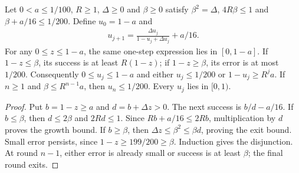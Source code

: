 \begin{lemma}
    \label{lem:interleaved_trim_stopping_envelope}
    \leanok
    Let $0<a\le1/100$, $R\ge1$, $\Delta\ge0$ and $\beta\ge0$ satisfy
    $\beta^2=\Delta$, $4R\beta\le1$ and $\beta+a/16\le1/200$.
    Define $u_0=1-a$ and
    \begin{align}
        u_{j+1}=\frac{\Delta u_j}{1-u_j+\Delta u_j}+a/16.
        \label{eq:interleaved_trim_scalar_recurrence}
    \end{align}
    For any $0\le z\le1-a$, the same one-step expression lies in
    $[0,1-a]$. If $1-z\le\beta$, its success is at least $R(1-z)$;
    if $1-z\ge\beta$, its error is at most $1/200$.
    Consequently $0\le u_j\le1-a$ and either $u_j\le1/200$ or
    $1-u_j\ge R^ja$. If $n\ge1$ and $\beta\le R^{n-1}a$, then
    $u_n\le1/200$. Every $u_j$ lies in $[0,1)$.
\end{lemma}
\begin{proof}\leanok
    Put $b=1-z\ge a$ and $d=b+\Delta z>0$. The next success is
    $b/d-a/16$. If $b\le\beta$, then $d\le2\beta$ and $2Rd\le1$.
    Since $Rb+a/16\le2Rb$, multiplication by $d$ proves the growth bound.
    If $b\ge\beta$, then $\Delta z\le\beta^2\le\beta d$, proving
    the exit bound. Small error persists, since $1-z\ge199/200\ge\beta$.
    Induction gives the disjunction. At round $n-1$, either error is
    already small or success is at least $\beta$; the final round exits.
\end{proof}

